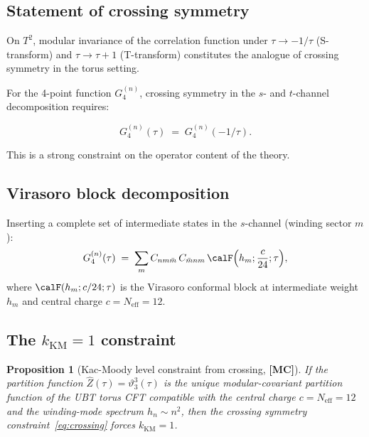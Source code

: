 \documentclass[12pt,a4paper]{article}
\newtheorem{proposition}[theorem]{Proposition}
\theoremstyle{definition}
\theoremstyle{remark}
\newcommand{\MC}{\textbf{[MC]}}
\newcommand{\vth}{\vartheta}
\begin{document}
\subsection{Statement of crossing symmetry}

On $T^2$, modular invariance of the correlation function under
$\tau \to -1/\tau$ (S-transform) and $\tau \to \tau + 1$ (T-transform)
constitutes the analogue of crossing symmetry in the torus setting.

For the 4-point function $G_4^{(n)}$, crossing symmetry in the $s$- and
$t$-channel decomposition requires:

\begin{equation}
\label{eq:crossing}
  G_4^{(n)}(\tau) \;=\; G_4^{(n)}(-1/\tau).
\end{equation}

This is a strong constraint on the operator content of the theory.

\subsection{Virasoro block decomposition}

Inserting a complete set of intermediate states in the $s$-channel (winding
sector $m$):
\[
  G_4^{(n)}(\tau)
  \;=\;
  \sum_m C_{nm\bar{m}}\,C_{\bar{m}nm}\,
  \calF\Bigl(h_m; \frac{c}{24}; \tau\Bigr),
\]
where $\calF(h_m; c/24; \tau)$ is the Virasoro conformal block at
intermediate weight $h_m$ and central charge $c = N_{\mathrm{eff}} = 12$.

\subsection{The $k_{\mathrm{KM}} = 1$ constraint}

\begin{proposition}[Kac-Moody level constraint from crossing, \MC]
\label{prop:k1}
If the partition function $\hat{Z}(\tau) = \vth_3^3(\tau)$ is the unique
modular-covariant partition function of the UBT torus CFT compatible with
the central charge $c = N_{\mathrm{eff}} = 12$ and the winding-mode spectrum
$h_n \sim n^2$, then the crossing symmetry constraint~\eqref{eq:crossing}
forces $k_{\mathrm{KM}} = 1$.
\end{proposition}
\end{document}

